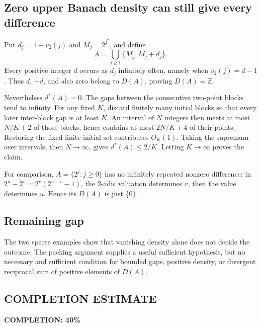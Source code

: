 \subsection*{Zero upper Banach density can still give every difference}
Put $d_j=1+v_2(j)$ and $M_j=2^{j^2}$, and define
\[
 A=\bigcup_{j\ge1}\{M_j,M_j+d_j\}.
\]
Every positive integer $d$ occurs as $d_j$ infinitely often, namely when $v_2(j)=d-1$. Thus $d$, $-d$, and also zero belong to $D(A)$, proving $D(A)=\mathbb Z$.

Nevertheless $d^*(A)=0$. The gaps between the consecutive two-point blocks tend to infinity. For any fixed $K$, discard finitely many initial blocks so that every later inter-block gap is at least $K$. An interval of $N$ integers then meets at most $N/K+2$ of those blocks, hence contains at most $2N/K+4$ of their points. Restoring the fixed finite initial set contributes $O_K(1)$. Taking the supremum over intervals, then $N\to\infty$, gives $d^*(A)\le2/K$. Letting $K\to\infty$ proves the claim.

For comparison, $A=\{2^j:j\ge0\}$ has no infinitely repeated nonzero difference: in $2^u-2^v=2^v(2^{u-v}-1)$, the $2$-adic valuation determines $v$, then the value determines $u$. Hence its $D(A)$ is just $\{0\}$.

\subsection*{Remaining gap}
The two sparse examples show that vanishing density alone does not decide the outcome. The packing argument supplies a useful sufficient hypothesis, but no necessary and sufficient condition for bounded gaps, positive density, or divergent reciprocal sum of positive elements of $D(A)$.
\subsection*{COMPLETION ESTIMATE}
\textbf{COMPLETION: 40\%}
